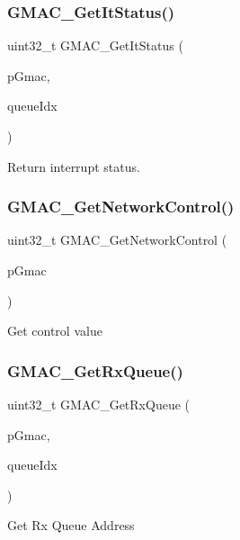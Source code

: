 \subsubsection{\texorpdfstring{GMAC\_GetItStatus()}{GMAC\_GetItStatus()}}
{\footnotesize\ttfamily uint32\+\_\+t G\+M\+A\+C\+\_\+\+Get\+It\+Status (\begin{DoxyParamCaption}\item[{\mbox{\hyperlink{structGmac}{Gmac}} $\ast$}]{p\+Gmac,  }\item[{gmac\+Que\+List\+\_\+t}]{queue\+Idx }\end{DoxyParamCaption})}

Return interrupt status. \mbox{\label{group__gmac__defines_gaa57ed8dc6b5f1584d884e067cad8fb6e}} 
\subsubsection{\texorpdfstring{GMAC\_GetNetworkControl()}{GMAC\_GetNetworkControl()}}
{\footnotesize\ttfamily uint32\+\_\+t G\+M\+A\+C\+\_\+\+Get\+Network\+Control (\begin{DoxyParamCaption}\item[{\mbox{\hyperlink{structGmac}{Gmac}} $\ast$}]{p\+Gmac }\end{DoxyParamCaption})}

Get control value \mbox{\label{group__gmac__defines_ga75a37904d053aee0b413914d73b45ff1}} 
\subsubsection{\texorpdfstring{GMAC\_GetRxQueue()}{GMAC\_GetRxQueue()}}
{\footnotesize\ttfamily uint32\+\_\+t G\+M\+A\+C\+\_\+\+Get\+Rx\+Queue (\begin{DoxyParamCaption}\item[{\mbox{\hyperlink{structGmac}{Gmac}} $\ast$}]{p\+Gmac,  }\item[{gmac\+Que\+List\+\_\+t}]{queue\+Idx }\end{DoxyParamCaption})}

Get Rx Queue Address \mbox{\label{group__gmac__defines_gacf2a7803b8177d1ec6837d76de5c5e7a}} 
